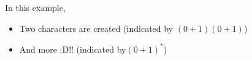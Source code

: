 \documentclass[12pt]{article}
\begin{document}
\begin{enumerate}[a.]
\begin{itemize}
\begin{enumerate}[1.]
\begin{mdframed}
                \bigskip

                In this example,

                \bigskip

                \begin{itemize}
                    \item Two characters are created (indicated by $(0+1)(0+1)$)
                    \item And more :D!! (indicated by$(0+1)^*$)
                \end{itemize}
            \end{mdframed}
        \end{enumerate}
    \end{itemize}
\end{enumerate}
\end{document}

